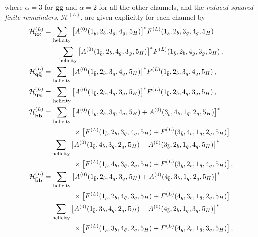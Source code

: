 \documentclass[main.tex]{subfiles}
\begin{document}
where $\alpha=3$ for $\mathbf{gg}$ and $\alpha=2$ for all the other channels, and the \textit{reduced squared finite remainders}, $\mathcal{H}^{(L)}$, are given explicitly for each channel by
\begingroup
\allowdisplaybreaks
\begin{align}
\label{eq:channel_gg}
\mathcal{H}^{(L)}_{\mathbf{gg}} & = \sumhel \big[A^{(0)}(1_{\bar b},2_{b},3_{g},4_{g} ,5_{H})\big]^* F^{(L)}(1_{\bar b},2_{b},3_{g},4_{g} ,5_{H})  \nn
                                & \quad + \sumhel \big[A^{(0)}(1_{\bar b},2_{b},4_{g},3_{g} ,5_{H})\big]^* F^{(L)}(1_{\bar b},2_{b},4_{g},3_{g} ,5_{H}) \,, \\
%
\label{eq:channel_qQ}
\mathcal{H}^{(L)}_{\mathbf{q\bar{q}}} & = \sumhel \big[A^{(0)}(1_{\bar b},2_{b},3_{\bar{q}},4_{q} ,5_{H})\big]^* F^{(L)}(1_{\bar b},2_{b},3_{\bar{q}},4_{q} ,5_{H}) \,, \\
%
\label{eq:channel_Qq}
\mathcal{H}^{(L)}_{\mathbf{\bar{q}q}} & = \sumhel \big[A^{(0)}(1_{\bar b},2_{b},4_{\bar{q}},3_{q} ,5_{H})\big]^* F^{(L)}(1_{\bar b},2_{b},4_{\bar{q}},3_{q} ,5_{H}) \,, \\
%
\label{eq:channel_bB}
\mathcal{H}^{(L)}_{\mathbf{b\bar{b}}} & = \sumhel \big[ A^{(0)}(1_{\bar b},2_{b},3_{\bar{q}},4_{q} ,5_{H}) + A^{(0)}(3_{\bar b},4_{b},1_{\bar{q}},2_{q} ,5_{H}) \big]^*  \nn
                                      &   \hspace{1.5cm} \times  \big[ F^{(L)}(1_{\bar b},2_{b},3_{\bar{q}},4_{q} ,5_{H}) + F^{(L)}(3_{\bar b},4_{b},1_{\bar{q}},2_{q} ,5_{H}) \big] \nn
                                      &  + \sumhel  \big[ A^{(0)}(1_{\bar b},4_{b},3_{\bar{q}},2_{q} ,5_{H}) + A^{(0)}(3_{\bar b},2_{b},1_{\bar{q}},4_{q} ,5_{H}) \big]^*  \nn
                                      &   \hspace{1.5cm} \times  \big[ F^{(L)}(1_{\bar b},4_{b},3_{\bar{q}},2_{q} ,5_{H}) + F^{(L)}(3_{\bar b},2_{b},1_{\bar{q}},4_{q} ,5_{H}) \big] \,, \\
%
\label{eq:channel_Bb}
\mathcal{H}^{(L)}_{\mathbf{\bar{b}b}} & = \sumhel       \big[ A^{(0)}(1_{\bar b},2_{b},4_{\bar{q}},3_{q} ,5_{H}) + A^{(0)}(4_{\bar b},3_{b},1_{\bar{q}},2_{q} ,5_{H}) \big]^*  \nn
                                      &   \hspace{1.5cm} \times  \big[ F^{(L)}(1_{\bar b},2_{b},4_{\bar{q}},3_{q} ,5_{H}) + F^{(L)}(4_{\bar b},3_{b},1_{\bar{q}},2_{q} ,5_{H}) \big] \nn
                                      &  + \sumhel    \big[ A^{(0)}(1_{\bar b},3_{b},4_{\bar{q}},2_{q} ,5_{H}) + A^{(0)}(4_{\bar b},2_{b},1_{\bar{q}},3_{q} ,5_{H}) \big]^*  \nn
                                      &   \hspace{1.5cm} \times  \big[ F^{(L)}(1_{\bar b},3_{b},4_{\bar{q}},2_{q} ,5_{H}) + F^{(L)}(4_{\bar b},2_{b},1_{\bar{q}},3_{q} ,5_{H}) \big] \,, \\

\end{align}
\end{document}
